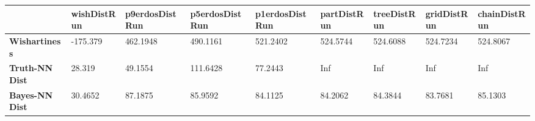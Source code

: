 \begin{tabular}{|l|l|l|l|l|l|l|l|l|}
\hline
&\textbf{wishDistRun}&\textbf{p9erdosDistRun}&\textbf{p5erdosDistRun}&\textbf{p1erdosDistRun}&\textbf{partDistRun}&\textbf{treeDistRun}&\textbf{gridDistRun}&\textbf{chainDistRun}\\\hline
\textbf{Wishartiness}&-175.379&462.1948&490.1161&521.2402&524.5744&524.6088&524.7234&524.8067\\\hline
\textbf{Truth-NN Dist}&28.319&49.1554&111.6428&77.2443&Inf&Inf&Inf&Inf\\\hline
\textbf{Bayes-NN Dist}&30.4652&87.1875&85.9592&84.1125&84.2062&84.3844&83.7681&85.1303\\\hline
\end{tabular}
